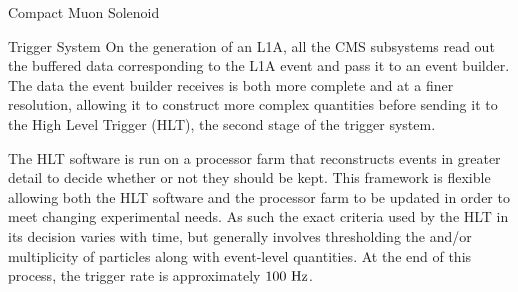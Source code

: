 \begin{section}{Compact Muon Solenoid}
\begin{subsection}{Trigger System}
On the generation of an L1A, all the CMS subsystems read out the buffered data corresponding to the L1A event and pass it to an event builder.
The data the event builder receives is both more complete and at a finer resolution, allowing it to construct more complex quantities before sending it to the High Level Trigger (HLT), the second stage of the trigger system.

The HLT software is run on a processor farm that reconstructs events in greater detail to decide whether or not they should be kept.
This framework is flexible allowing both the HLT software and the processor farm to be updated in order to meet changing experimental needs.
As such the exact criteria used by the HLT in its decision varies with time, but generally involves thresholding the \pT and/or multiplicity of particles along with event-level quantities.
At the end of this process, the trigger rate is approximately $100~\mathrm{Hz}$.

\end{subsection}

\end{section}
